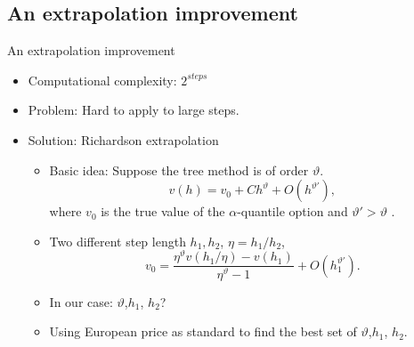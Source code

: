 \documentclass[cjk,10pt]{beamer}
\begin{document}
%

\subsection{An extrapolation improvement}

\begin{frame}{An extrapolation improvement}
\begin{itemize}
\item
Computational complexity: $2^{steps}$
\item
Problem: Hard to apply to large steps. 
\item
Solution: Richardson extrapolation
\begin{itemize}
\item
Basic idea: Suppose the tree method is of order $\vartheta$.  
\[
v(h) = v_0 + Ch^\vartheta + O(h^{\vartheta'}),
\]
where $v_0$ is the true value of the $\alpha$-quantile option and $\vartheta' > \vartheta$ .
\item
Two different step length $h_1, h_2$, $\eta = h_1/h_2$, 
\[
v_0= \frac{{\eta}^\vartheta v({h_1}/{\eta}) - v(h_1)}{{\eta}^\vartheta -1} + O(h_1^{\vartheta'}).
\]
\item
In our case: $\vartheta$,$h_1$, $h_2$?
\item
Using European price as standard to find the best set of {$\vartheta$,$h_1$, $h_2$}.
\end{itemize} 

\end{itemize}
\end{frame}
\end{document}
